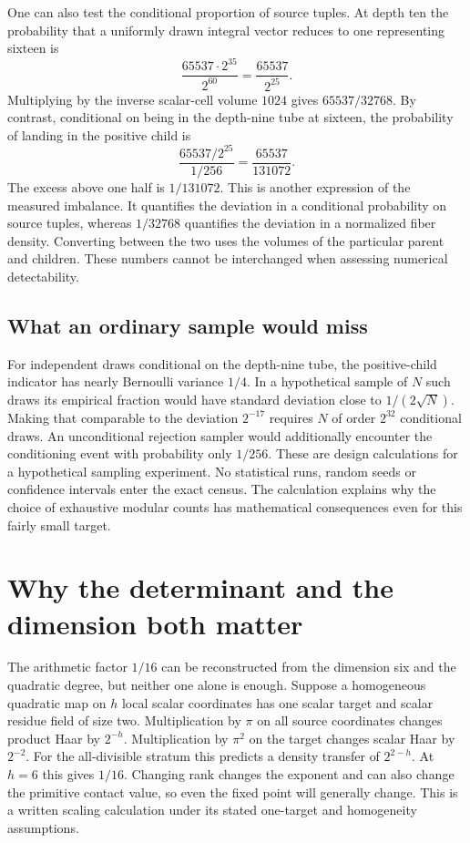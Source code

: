 \documentclass[12pt,letterpaper]{article}
\begin{document}
One can also test the conditional proportion of source tuples. At depth ten the probability that a uniformly drawn integral vector reduces to one representing sixteen is
\[
      \frac{65537\cdot2^{35}}{2^{60}}=\frac{65537}{2^{25}}.
\]
Multiplying by the inverse scalar-cell volume $1024$ gives $65537/32768$. By contrast, conditional on being in the depth-nine tube at sixteen, the probability of landing in the positive child is
\[
     \frac{65537/2^{25}}{1/256}=\frac{65537}{131072}.
\]
The excess above one half is $1/131072$. This is another expression of the measured imbalance. It quantifies the deviation in a conditional probability on source tuples, whereas $1/32768$ quantifies the deviation in a normalized fiber density. Converting between the two uses the volumes of the particular parent and children. These numbers cannot be interchanged when assessing numerical detectability.

\subsection{What an ordinary sample would miss}
For independent draws conditional on the depth-nine tube, the positive-child indicator has nearly Bernoulli variance $1/4$. In a hypothetical sample of $N$ such draws its empirical fraction would have standard deviation close to $1/(2\sqrt N)$. Making that comparable to the deviation $2^{-17}$ requires $N$ of order $2^{32}$ conditional draws. An unconditional rejection sampler would additionally encounter the conditioning event with probability only $1/256$. These are design calculations for a hypothetical sampling experiment. No statistical runs, random seeds or confidence intervals enter the exact census. The calculation explains why the choice of exhaustive modular counts has mathematical consequences even for this fairly small target.

\section{Why the determinant and the dimension both matter}
The arithmetic factor $1/16$ can be reconstructed from the dimension six and the quadratic degree, but neither one alone is enough. Suppose a homogeneous quadratic map on $h$ local scalar coordinates has one scalar target and scalar residue field of size two. Multiplication by $\pi$ on all source coordinates changes product Haar by $2^{-h}$. Multiplication by $\pi^2$ on the target changes scalar Haar by $2^{-2}$. For the all-divisible stratum this predicts a density transfer of $2^{2-h}$. At $h=6$ this gives $1/16$. Changing rank changes the exponent and can also change the primitive contact value, so even the fixed point will generally change. This is a written scaling calculation under its stated one-target and homogeneity assumptions.
\end{document}
